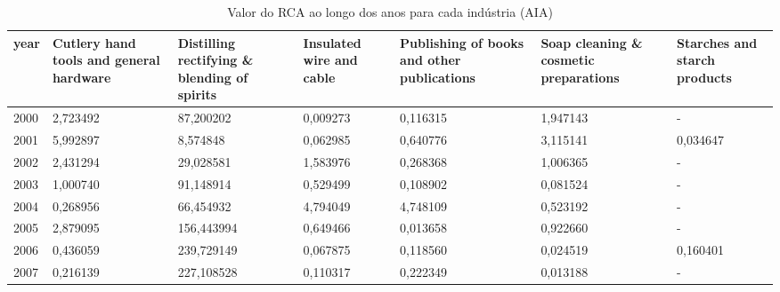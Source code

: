 \begin{table}
\centering
\caption{Valor do RCA ao longo dos anos para cada indústria (AIA)}
\begin{tabular}{p{1cm}p{2cm}p{2cm}p{2cm}p{2cm}p{2cm}p{2cm}}
\toprule
 year &  Cutlery hand tools and general hardware &  Distilling rectifying \& blending of spirits &  Insulated wire and cable &  Publishing of books and other publications &  Soap cleaning \& cosmetic preparations &  Starches and starch products \\
\midrule
 2000 &                                 2,723492 &                                    87,200202 &                  0,009273 &                                    0,116315 &                               1,947143 &                             - \\
 2001 &                                 5,992897 &                                     8,574848 &                  0,062985 &                                    0,640776 &                               3,115141 &                      0,034647 \\
 2002 &                                 2,431294 &                                    29,028581 &                  1,583976 &                                    0,268368 &                               1,006365 &                             - \\
 2003 &                                 1,000740 &                                    91,148914 &                  0,529499 &                                    0,108902 &                               0,081524 &                             - \\
 2004 &                                 0,268956 &                                    66,454932 &                  4,794049 &                                    4,748109 &                               0,523192 &                             - \\
 2005 &                                 2,879095 &                                   156,443994 &                  0,649466 &                                    0,013658 &                               0,922660 &                             - \\
 2006 &                                 0,436059 &                                   239,729149 &                  0,067875 &                                    0,118560 &                               0,024519 &                      0,160401 \\
 2007 &                                 0,216139 &                                   227,108528 &                  0,110317 &                                    0,222349 &                               0,013188 &                             - \\

\end{tabular}
\end{table}
